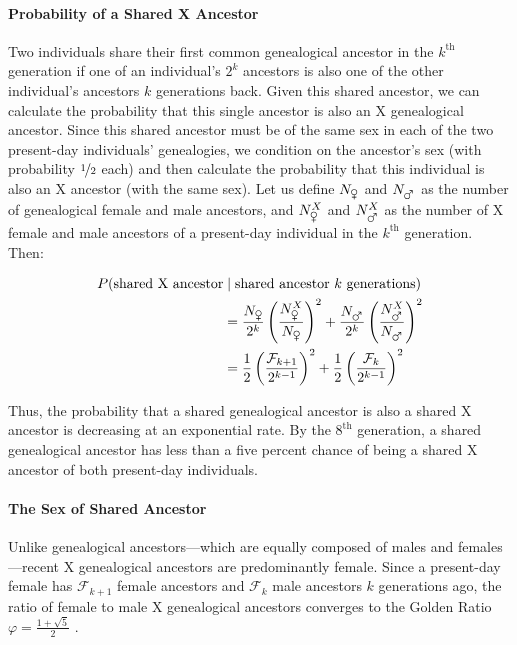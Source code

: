 \documentclass[9pt,twocolumn,twoside]{gsajnl}
\begin{document}
\paragraph{Probability of a Shared X Ancestor} 

Two individuals share their first common genealogical ancestor in the
$k^\text{th}$ generation if one of an individual's $2^k$ ancestors is also one
of the other individual's ancestors $k$ generations back. Given this shared
ancestor, we can calculate the probability that this single ancestor is also an
X genealogical ancestor. Since this shared ancestor must be of the same sex in
each of the two present-day individuals' genealogies, we condition on the
ancestor's sex (with probability $\nicefrac{1}{2}$ each) and then calculate the
probability that this individual is also an X ancestor (with the same sex). Let
us define $N_{\venus}$ and $N_{\mars}$ as the number of genealogical female and
male ancestors, and $N_{\venus}^X$ and $N_{\mars}^X$ as the number of X female
and male ancestors of a present-day individual in the $k^\text{th}$ generation.
Then:

\begin{align}
  P(\text{shared X ancestor} & \; | \; \text{shared ancestor } k \text{ generations})  \nonumber\\
  &= \frac{N_{\venus}}{2^k}\left(\frac{N_{\venus}^X}{N_{\venus}}\right)^2 + 
  \frac{N_{\mars}}{2^k}\left(\frac{N_{\mars}^X}{N_{\mars}}\right)^2 \nonumber \\
  &= \frac{1}{2}\left(\frac{\mathcal{F}_{k+1}}{2^{k-1}}\right)^2 + \frac{1}{2}\left(\frac{\mathcal{F}_k}{2^{k-1}}\right)^2
  \label{eq:prob-shared-x-ancestor}
\end{align}

Thus, the probability that a shared genealogical ancestor is also a shared X
ancestor is decreasing at an exponential rate. By the $8^\text{th}$ generation,
a shared genealogical ancestor has less than a five percent chance of being a
shared X ancestor of both present-day individuals.

\paragraph{The Sex of Shared Ancestor}
\label{p:sex-of-shared-ancestor}

Unlike genealogical ancestors---which are equally composed of males and
females---recent X genealogical ancestors are predominantly female. Since a
present-day female has $\mathcal{F}_{k+1}$ female ancestors and
$\mathcal{F}_{k}$ male ancestors $k$ generations ago, the ratio of female to
male X genealogical ancestors converges to the Golden Ratio $\varphi = \frac{1
+ \sqrt{5}}{2}$ \citep{simson1753explication}.
\end{document}
